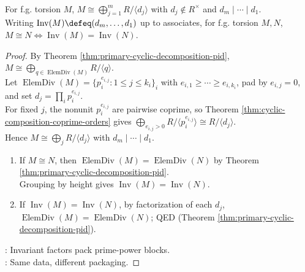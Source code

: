 \begin{theorem} \label{thm:pid-invariant-factor-decomposition} \\
For f.g. torsion $M$, $M\cong\bigoplus_{j=1}^mR/\langle d_j\rangle$ with $d_j\notin R^\times$ and $d_m\mid\cdots\mid d_1$.\\
Writing $\operatorname{Inv}(M)\defeq(d_m,\ldots,d_1)$ up to associates, for f.g. torsion $M,N$, $M\cong N\iff\operatorname{Inv}(M)=\operatorname{Inv}(N)$.
\begin{proof} By Theorem \ref{thm:primary-cyclic-decomposition-pid}, $M\cong\bigoplus_{q\in\operatorname{ElemDiv}(M)}R/\langle q\rangle$.\\
Let $\operatorname{ElemDiv}(M)=\{p_i^{e_{i,j}}:1\leq j\leq k_i\}_i$ with $e_{i,1}\geq\cdots\geq e_{i,k_i}$, pad by $e_{i,j}=0$, and set $d_j=\prod_ip_i^{e_{i,j}}$.\\
For fixed $j$, the nonunit $p_i^{e_{i,j}}$ are pairwise coprime, so Theorem \ref{thm:cyclic-composition-coprime-orders} gives $\bigoplus_{e_{i,j}>0}R/\langle p_i^{e_{i,j}}\rangle\cong R/\langle d_j\rangle$.\\
Hence $M\cong\bigoplus_jR/\langle d_j\rangle$ with $d_m\mid\cdots\mid d_1$.
\begin{enumerate}[label=\roman*.]
\setlength{\itemsep}{0pt}
\item[$(\Rightarrow)$] If $M\cong N$, then $\operatorname{ElemDiv}(M)=\operatorname{ElemDiv}(N)$ by Theorem \ref{thm:primary-cyclic-decomposition-pid}. \\
Grouping by height gives $\operatorname{Inv}(M)=\operatorname{Inv}(N)$.
\item[$(\Leftarrow)$] If $\operatorname{Inv}(M)=\operatorname{Inv}(N)$, by factorization of each $d_j$, $\operatorname{ElemDiv}(M)=\operatorname{ElemDiv}(N)$; QED (Theorem \ref{thm:primary-cyclic-decomposition-pid}).
\end{enumerate}
: Invariant factors pack prime-power blocks.\\
: Same data, different packaging.
\end{proof}
\end{theorem}

